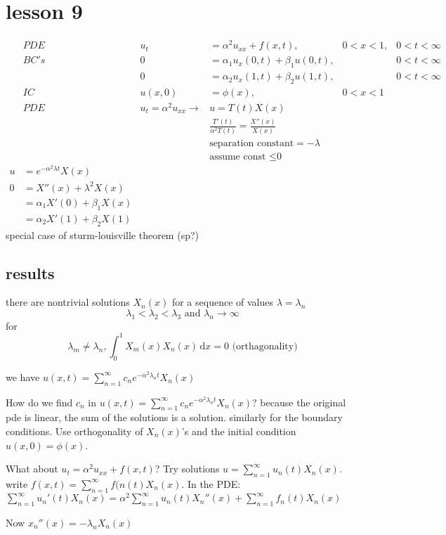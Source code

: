 \documentclass{article}
\begin{document}
\section*{lesson 9}
\begin{align*}
  &PDE&u_t&=\alpha^2u_{xx}+f(x,t),& 0<x<1,&0<t<\infty\\
  &BC's&0&=\alpha_1u_x(0,t)+\beta_1u(0,t),&&0<t<\infty\\
  &&0&=\alpha_2u_x(1,t)+\beta_2u(1,t),&&0<t<\infty\\
  &IC&u(x,0)&=\phi(x),&0<x<1\\
  &PDE&u_t=\alpha^2u_{xx}\to &u=T(t)X(x)\\
  &&&\frac{T'(t)}{\alpha^2T(t)}=\frac{X''(x)}{X(x)}\\
  &&&\text{separation constant}=-\lambda\\
  &&&\text{assume const $\leq$0}\\
  u&=e^{-\alpha^2\lambda t}X(x)\\
  0&=X''(x)+\lambda^2X(x)\\
  &=\alpha_1X'(0)+\beta_1X(x)\\
  &=\alpha_2X'(1)+\beta_2X(1)
\end{align*}
special case of sturm-louisville theorem (sp?)

\subsection*{results}
there are nontrivial solutions $X_n(x)$ for a sequence of values $\lambda=\lambda_n$
\[\lambda_1<\lambda_2<\lambda_3 \text{ and } \lambda_n\to\infty\]
for \[\lambda_m\neq\lambda_n,\int_0^1{X_m(x)X_n(x)\,\mathrm{d}x}=0\text{ (orthagonality)}\]

we have $u(x,t)=\sum\limits_{n=1}^\infty{c_ne^{-\alpha^2\lambda_n t}X_n(x)}$

How do we find $c_n$ in $u(x,t)=\sum\limits_{n=1}^\infty{c_ne^{-\alpha^2\lambda_n t}X_n(x)}$? because the original pde is linear, the sum of the solutions is a solution. similarly for the boundary conditions. Use orthogonality of $X_n(x)$'s and the initial condition $u(x,0)=\phi(x)$.

What about $u_t=\alpha^2u_{xx}+f(x,t)$? Try solutions $u=\sum\limits_{n=1}^\infty{u_n(t)X_n(x)}$. write $f(x,t)=\sum\limits_{n=1}^\infty{f(n(t)X_n(x)}$. In the PDE: $\sum\limits_{n=1}^\infty{{u_n}'(t)X_n(x)=\alpha^2\sum\limits_{n=1}^\infty{u_n(t){X_n}''(x)}}+\sum\limits_{n=1}^\infty{f_n(t)X_n(x)}$

Now ${x_n}''(x)=-\lambda_nX_n(x)$
\end{document}
